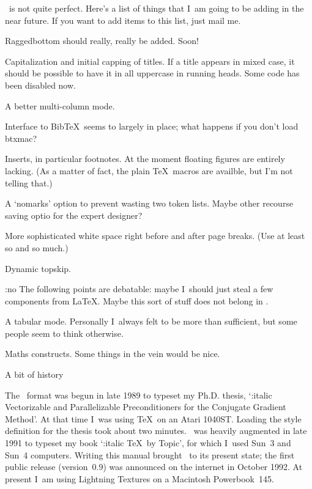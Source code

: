 \Lollipop\ is not quite perfect. Here's a list of things that I~am
going to be adding in the near future. If you want to add items to
this list, just mail me.

\Enumerate\item Raggedbottom should really, really be added. Soon!

\item Capitalization and initial capping of titles. If a
title appears in mixed case, it should be possible to have it in all
uppercase in running heads. Some code has been disabled now.

\item A better multi-column mode.

\item Interface to Bib\TeX\ seems to largely in place; what happens
if you don't load btxmac?

\item Inserts, in particular footnotes. At the moment floating
figures are entirely lacking. (As a matter of fact, the plain \TeX\
macros are availble, but I'm not telling that.)

\item A `nomarks' option to prevent wasting two token lists.
Maybe other recourse saving optio for the expert designer?

\item More sophisticated white space right before and after
page breaks. (Use at least so and so much.)

\item Dynamic topskip.

{\PopIndentLevel\Indent:no The following points are debatable:
maybe I~should just steal a few components from \LaTeX. Maybe this
sort of stuff does not belong in \Lollipop.\par}

\item A tabular mode. Personally I~always felt  to be more
than sufficient, but some people seem to think otherwise.

\item Maths constructs. Some things in the  vein would be
nice.

\>

\SubSection A bit of history

The \Lollipop\ format was begun in late 1989 to typeset my Ph.D.
thesis, `{\Style:italic Vectorizable and Parallelizable
Preconditioners for the Conjugate Gradient Method}'. At that time 
I~was using \TeX\ on an Atari 1040ST.
Loading the style definition for the thesis took about two minutes.
\Lollipop\ was heavily augmented in late 1991 to typeset my book
`{\Style:italic \TeX\ by Topic}', for which I~used Sun~3 and Sun~4
computers. Writing this manual brought \Lollipop\ to its present
state; the first public release (version~0.9) was announced on the
internet in October 1992. At present I~am using Lightning Textures on a
Macintosh Powerbook~145.

